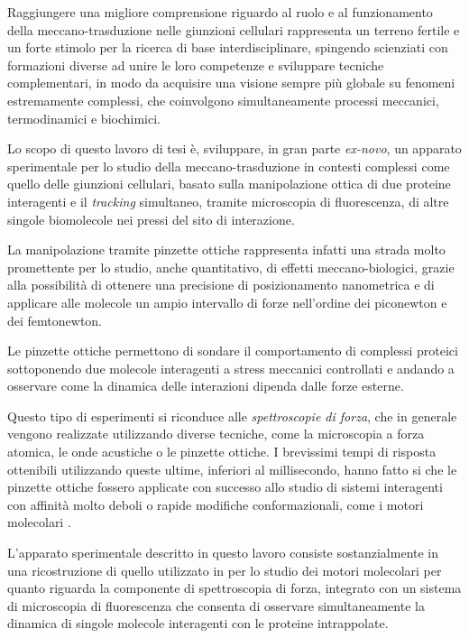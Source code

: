 Raggiungere una migliore comprensione riguardo al ruolo e al
funzionamento della meccano-trasduzione nelle giunzioni cellulari
rappresenta un terreno fertile e un forte stimolo per la ricerca
di base interdisciplinare, spingendo scienziati con formazioni diverse
ad unire le loro competenze e sviluppare tecniche complementari, in
modo da acquisire una visione sempre più globale su fenomeni
estremamente complessi, che coinvolgono simultaneamente processi
meccanici, termodinamici e biochimici.

Lo scopo di questo lavoro di tesi è, sviluppare, in gran parte
\textit{ex-novo}, un apparato sperimentale per lo studio della
meccano-trasduzione in contesti complessi come quello delle giunzioni
cellulari, basato sulla manipolazione ottica di due proteine
interagenti e il \textit{tracking} simultaneo, tramite microscopia di
fluorescenza, di altre singole biomolecole nei pressi del sito di
interazione.

La manipolazione tramite pinzette ottiche rappresenta infatti una
strada molto promettente per lo studio, anche quantitativo, di
effetti meccano-biologici, grazie alla possibilità di ottenere una
precisione di posizionamento nanometrica e di applicare alle molecole
un ampio intervallo di forze nell'ordine dei piconewton e dei
femtonewton.

Le pinzette ottiche permettono di sondare il comportamento di
complessi proteici sottoponendo due molecole interagenti a stress
meccanici controllati e andando a osservare come la dinamica delle
interazioni dipenda dalle forze esterne.

Questo tipo di esperimenti si riconduce alle
\emph{spettroscopie di forza},
che in generale vengono realizzate utilizzando diverse tecniche, come
la microscopia a forza atomica, le onde acustiche o le pinzette
ottiche.
I brevissimi tempi di risposta ottenibili utilizzando queste ultime,
inferiori al millisecondo, hanno fatto si che le pinzette ottiche
fossero applicate con successo allo studio di sistemi interagenti con
affinità molto deboli o rapide modifiche conformazionali, come i
motori molecolari \cite{Capitanio2012}.

L'apparato sperimentale descritto in questo lavoro consiste
sostanzialmente in una ricostruzione di quello utilizzato in
\cite{Capitanio2012}
per lo studio dei motori molecolari per quanto riguarda la componente
di spettroscopia di forza, integrato con un sistema di microscopia di
fluorescenza che consenta di osservare simultaneamente la dinamica di
singole molecole interagenti con le proteine intrappolate.

